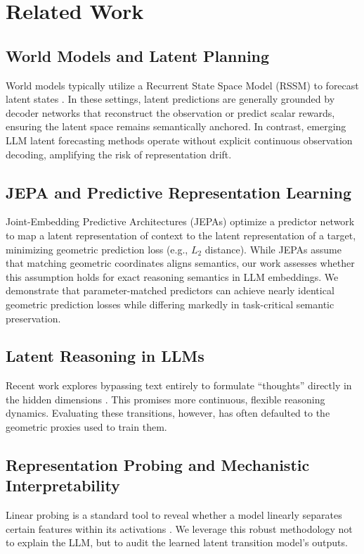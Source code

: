 \documentclass[conference]{IEEEtran}
\begin{document}
\section{Related Work}

\subsection{World Models and Latent Planning}
World models typically utilize a Recurrent State Space Model (RSSM) to forecast latent states \cite{hafner2023mastering}. In these settings, latent predictions are generally grounded by decoder networks that reconstruct the observation or predict scalar rewards, ensuring the latent space remains semantically anchored. In contrast, emerging LLM latent forecasting methods operate without explicit continuous observation decoding, amplifying the risk of representation drift.

\subsection{JEPA and Predictive Representation Learning}
Joint-Embedding Predictive Architectures (JEPAs) \cite{lecun2022path, assran2023self, bardes2024vjepa, ge2024llmjepa} optimize a predictor network to map a latent representation of context to the latent representation of a target, minimizing geometric prediction loss (e.g., $L_2$ distance). While JEPAs assume that matching geometric coordinates aligns semantics, our work assesses whether this assumption holds for exact reasoning semantics in LLM embeddings. We demonstrate that parameter-matched predictors can achieve nearly identical geometric prediction losses while differing markedly in task-critical semantic preservation.

\subsection{Latent Reasoning in LLMs}
Recent work explores bypassing text entirely to formulate ``thoughts'' directly in the hidden dimensions \cite{belrose2023eliciting}. This promises more continuous, flexible reasoning dynamics. Evaluating these transitions, however, has often defaulted to the geometric proxies used to train them.

\subsection{Representation Probing and Mechanistic Interpretability}
Linear probing is a standard tool to reveal whether a model linearly separates certain features within its activations \cite{alain2017understanding}. We leverage this robust methodology not to explain the LLM, but to audit the learned latent transition model's outputs.
\end{document}
